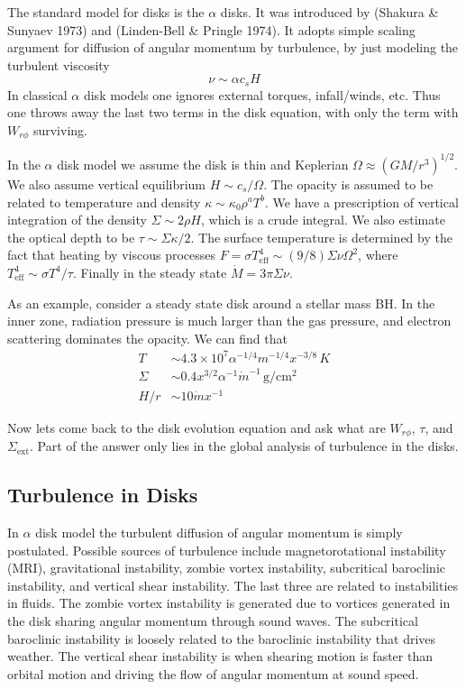 \documentclass[letterpaper, 11pt]{article}
\numberwithin{equation}{section}
\numberwithin{figure}{section}
\begin{document}
The standard model for disks is the $\alpha$ disks. It was introduced by
(Shakura \& Sunyaev 1973) and (Linden-Bell \& Pringle 1974). It adopts simple
scaling argument for diffusion of angular momentum by turbulence, by just
modeling the turbulent viscosity
\begin{equation}
  \label{eq:10}
  \nu \sim \alpha c_s H
\end{equation}
In classical $\alpha$ disk models one ignores external torques, infall/winds,
etc. Thus one throws away the last two terms in the disk equation, with only the
term with $W_{r\phi}$ surviving.

In the $\alpha$ disk model we assume the disk is thin and Keplerian $\Omega
\approx (GM/r^3)^{1/2}$. We also assume vertical equilibrium $H \sim
c_s/\Omega$. The opacity is assumed to be related to temperature and density $\kappa \sim
\kappa_0\rho^aT^{b}$. We have a prescription of vertical integration of the
density $\Sigma \sim 2\rho H$, which is a crude integral. We also estimate the
optical depth to be $\tau \sim \Sigma \kappa / 2$. The surface temperature is
determined by the fact that heating by viscous processes $F = \sigma
T_\mathrm{eff}^4 \sim (9/8)\Sigma \nu \Omega^2$, where $T_\mathrm{eff}^4 \sim
\sigma T^4/\tau$. Finally in the steady state $\dot{M} = 3\pi \Sigma \nu$.

As an example, consider a steady state disk around a stellar mass BH. In the
inner zone, radiation pressure is much larger than the gas pressure, and
electron scattering dominates the opacity. We can find that
\begin{align}
  T &\sim 4.3\times 10^7 \alpha^{-1/4}m^{-1/4}x^{-3/8}\,K \\
  \Sigma &\sim 0.4 x^{3/2}\alpha^{-1}\dot{m}^{-1}\,\mathrm{g/cm^2} \\
  H/r &\sim 10 \dot{m}x^{-1}
\end{align}

Now lets come back to the disk evolution equation and ask what are $W_{r\phi}$,
$\tau$, and $\Sigma_\mathrm{ext}$. Part of the answer only lies in the global
analysis of turbulence in the disks.

\subsection{Turbulence in Disks}

In $\alpha$ disk model the turbulent diffusion of angular momentum is simply
postulated. Possible sources of turbulence include magnetorotational instability
(MRI), gravitational instability, zombie vortex instability, subcritical
baroclinic instability, and vertical shear instability. The last three are
related to instabilities in fluids. The zombie vortex instability is generated
due to vortices generated in the disk sharing angular momentum through sound
waves. The subcritical baroclinic instability is loosely related to the
baroclinic instability that drives weather. The vertical shear instability is
when shearing motion is faster than orbital motion and driving the flow of
angular momentum at sound speed.
\end{document}
